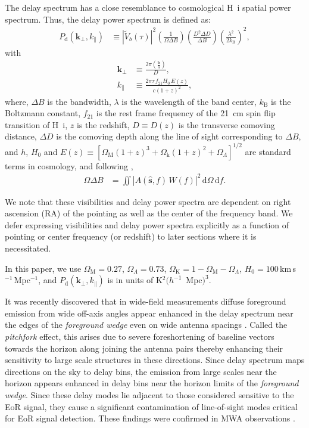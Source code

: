 \documentclass[preprint2,iop,numberedappendix,twocolappendix,appendixfloats]{emulateapj}
\newcommand{\dif}{\mathrm{d}}
\begin{document}
The delay spectrum has a close resemblance to cosmological H~{\sc i} spatial power spectrum. Thus, the delay power spectrum is defined as:
\begin{align}\label{eqn:delay-power-spectrum}
  P_\textrm{d}(\boldsymbol{k}_\perp,k_\parallel) &\equiv |\tilde{V}_b(\tau)|^2\left(\frac{1}{\Omega\Delta B}\right)\left(\frac{D^2\Delta D}{\Delta B}\right)\left(\frac{\lambda^2}{2k_\textrm{B}}\right)^2,
\end{align}
with
\begin{align}
  \boldsymbol{k}_\perp &\equiv \frac{2\pi(\frac{\boldsymbol{b}}{\lambda})}{D}, \label{eqn:kperp-baseline}\\
  k_\parallel &\equiv \frac{2\pi\tau\,f_{21}H_0\,E(z)}{c(1+z)^2}, \label{eqn:kprll-delay}
\end{align}
where, $\Delta B$ is the bandwidth, $\lambda$ is the wavelength of the band center, $k_\textrm{B}$ is the Boltzmann constant, $f_{21}$ is the rest frame frequency of the 21~cm spin flip transition of H~{\sc i}, $z$ is the redshift, $D\equiv D(z)$ is the transverse comoving distance, $\Delta D$ is the comoving depth along the line of sight corresponding to $\Delta B$, and $h$, $H_0$ and $E(z)\equiv [\Omega_\textrm{M}(1+z)^3+\Omega_\textrm{k}(1+z)^2+\Omega_\Lambda]^{1/2}$ are standard terms in cosmology, and following \citet{par14},
\begin{align}
  \Omega\Delta B &= \iint \left|A(\hat{\boldsymbol{s}},f)\,W(f)\right|^2\,\dif\Omega\,\dif f.
\end{align}

We note that these visibilities and delay power spectra are dependent on right ascension (RA) of the pointing as well as the center of the frequency band. We defer expressing visibilities and delay power spectra explicitly as a function of pointing or center frequency (or redshift) to later sections where it is necessitated.

In this paper, we use $\Omega_\textrm{M}=0.27$, $\Omega_\Lambda=0.73$, $\Omega_\textrm{K}=1-\Omega_\textrm{M}-\Omega_\Lambda$, $H_0=100\,$km$\,$s$^{-1}\,$Mpc$^{-1}$, and $P_\textrm{d}(\boldsymbol{k}_\perp,k_\parallel)$ is in units of K$^2 (h^{-1}$~Mpc$)^3$.

It was recently discovered that in wide-field measurements diffuse foreground emission from wide off-axis angles appear enhanced in the delay spectrum near the edges of the {\it foreground wedge} even on wide antenna spacings \citep{thy15a}. Called the {\it pitchfork} effect, this arises due to severe foreshortening of baseline vectors towards the horizon along joining the antenna pairs thereby enhancing their sensitivity to large scale structures in these directions. Since delay spectrum maps directions on the sky to delay bins, the emission from large scales near the horizon appears enhanced in delay bins near the horizon limits of the {\it foreground wedge}. Since these delay modes lie adjacent to those considered sensitive to the EoR signal, they cause a significant contamination of line-of-sight modes critical for EoR signal detection. These findings were confirmed in MWA observations \citep{thy15b}.
\end{document}
